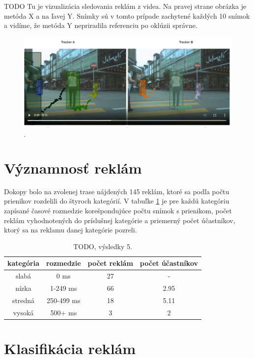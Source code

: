 TODO Tu je vizualizácia sledovania reklám z videa. Na pravej strane obrázka je metóda X a na ľavej Y. Snímky sú v tomto prípade zachytené každých 10 snímok a vidíme, že metóda Y nepriradila referenciu po oklúzii správne.
\begin{figure}[ht]
    \centering
    \includegraphics[width=1\textwidth]{images/05/vs.png}
    \caption{.}
    \label{img:road}
\end{figure}

\section{Významnosť reklám}

Dokopy bolo na zvolenej trase nájdených 145 reklám, ktoré sa podľa počtu prienikov rozdelili do štyroch kategórií. V tabuľke \ref{table:cat} je pre každú kategóriu zapísané časové rozmedzie korešpondujúce počtu snímok s prienikom, počet reklám vyhodnotených do príslušnej kategórie a priemerný počet účastníkov, ktorý sa na reklamu danej kategórie pozreli.
\\
\begin{table}[ht]
\centering
\begin{tabular}{|c c c c|}
 \hline
 kategória &	rozmedzie &	počet reklám &	počet účastníkov \\ [0.5ex]
 \hline
slabá &	0 ms &	27 &	- \\ [0.1ex]
nízka &	1-249 ms &	66 &	2.95 \\ [0.1ex]
stredná &	250-499 ms &	18 &	5.11 \\ [0.1ex]
vysoká &	500+ ms &	3 &	2 \\ [0.1ex]
 \hline
\end{tabular}
\caption{TODO, výsledky 5.}
\label{table:cat}
\end{table}



\section{Klasifikácia reklám}

